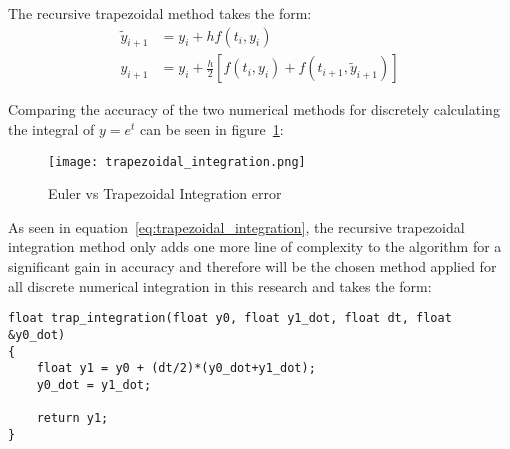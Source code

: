 The recursive trapezoidal method takes the form:
\begin{equation}\label{eq:trapezoidal_integration}
\begin{split}
\tilde{y}_{i+1}&=y_i+hf(t_i,y_i) \\
y_{i+1}&=y_i+\frac{h}{2}[f(t_i,y_i)+f(t_{i+1},\tilde{y}_{i+1})]
\end{split}
\end{equation}

Comparing the accuracy of the two numerical methods for discretely calculating the integral of $y=e^t$ can be seen in figure~\ref{fig:trapezoidal_integration}:

\begin{figure}[h!]
 \centering
  \texttt{[image: trapezoidal\_integration.png]}
  \caption{Euler vs Trapezoidal Integration error}
  \label{fig:trapezoidal_integration}
\end{figure}

As seen in equation~\ref{eq:trapezoidal_integration}, the recursive trapezoidal integration method only adds one more line of complexity to the algorithm for a significant gain in accuracy and therefore will be the chosen method applied for all discrete numerical integration in this research and takes the form: \newline

\begin{lstlisting}
float trap_integration(float y0, float y1_dot, float dt, float &y0_dot)
{
    float y1 = y0 + (dt/2)*(y0_dot+y1_dot);
    y0_dot = y1_dot;

    return y1;
}
\end{lstlisting}











